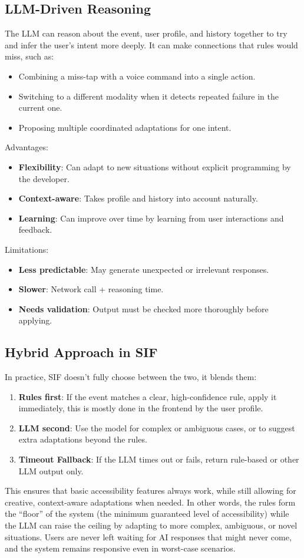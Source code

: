 \documentclass[openany]{book}
\begin{document}
\subsection{LLM-Driven Reasoning}
The LLM can reason about the event, user profile, and history together to try and infer the user's intent more deeply. It can make connections that rules would miss, such as:
\begin{itemize}
    \item Combining a miss-tap with a voice command into a single action.
    \item Switching to a different modality when it detects repeated failure in the current one.
    \item Proposing multiple coordinated adaptations for one intent.
\end{itemize}
Advantages:
\begin{itemize}
    \item \textbf{Flexibility}: Can adapt to new situations without explicit programming by the developer.
    \item \textbf{Context-aware}: Takes profile and history into account naturally.
    \item \textbf{Learning}: Can improve over time by learning from user interactions and feedback.
\end{itemize}
Limitations:
\begin{itemize}
    \item \textbf{Less predictable}: May generate unexpected or irrelevant responses.
    \item \textbf{Slower}: Network call + reasoning time.
    \item \textbf{Needs validation}: Output must be checked more thoroughly before applying.
\end{itemize}

\subsection{Hybrid Approach in SIF}
In practice, SIF doesn’t fully choose between the two, it blends them:
\begin{enumerate}
    \item \textbf{Rules first}: If the event matches a clear, high-confidence rule, apply it immediately, this is mostly done in the frontend by the user profile.
    \item \textbf{LLM second}: Use the model for complex or ambiguous cases, or to suggest extra adaptations beyond the rules.
    \item \textbf{Timeout Fallback}: If the LLM times out or fails, return rule-based or other LLM output only.
\end{enumerate}
This ensures that basic accessibility features always work, while still allowing for creative, context-aware adaptations when needed. In other words, the rules form the “floor” of the system (the minimum guaranteed level of accessibility) while the LLM can raise the ceiling by adapting to more complex, ambiguous, or novel situations. Users are never left waiting for AI responses that might never come, and the system remains responsive even in worst-case scenarios.
\end{document}
